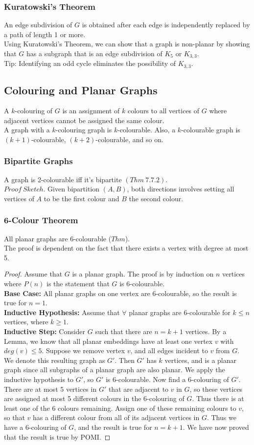 \documentclass[11pt]{article}
\newcommand{\nl}{\\[5pt]}
\begin{document}
\subsubsection{Kuratowski's Theorem}
An edge subdivision of $G$ is obtained after each edge is independently replaced by a path of length 1 or more. \nl 
Using Kuratowski's Theorem, we can show that a graph is non-planar by showing that $G$ has a subgraph that is an edge subdivision of $K_5$ or $K_{3,3}$.\nl 
Tip: Identifying an odd cycle eliminates the possibility of $K_{3,3}$.

\subsection{Colouring and Planar Graphs}
A $k$-colouring of $G$ is an assignment of $k$ colours to all vertices of $G$ where adjacent vertices cannot be assigned the same colour. \nl
A graph with a $k$-colouring graph is $k$-colourable. Also, a $k$-colourable graph is $(k+1)$-colourable, $(k+2)$-colourable, and so on.
\subsubsection{Bipartite Graphs}
A graph is 2-colourable iff it's bipartite $(Thm \: 7.7.2)$. \nl 
$Proof \: Sketch.$ Given bipartition $(A,B)$, both directions involves setting all vertices of $A$ to be the first colour and $B$ the second colour. \hfill \qedsymbol
\subsubsection{6-Colour Theorem}
All planar graphs are 6-colourable ($Thm$). \nl
The proof is dependent on the fact that there exists a vertex with degree at most 5. 
\begin{proof} Assume that $G$ is a planar graph. The proof is by induction on $n$ vertices where $P(n)$ is the statement that $G$ is 6-colourable. \nl 
\textbf{Base Case:} All planar graphs on one vertex are 6-colourable, so the result is true for $n = 1$. \nl 
\textbf{Inductive Hypothesis:} Assume that $\forall$ planar graphs are 6-colourable for $k \leq n$ vertices, where $k \geq 1$. \nl
\textbf{Inductive Step:} Consider $G$ such that there are $n = k + 1$ vertices. By a Lemma, we know that all planar embeddings have at least one vertex $v$ with $deg(v) \leq 5$. Suppose we remove vertex $v$, and all edges incident to $v$ from $G$. We denote this resulting graph as $G'$. Then $G'$ has $k$ vertices, and is a planar graph since all subgraphs of a planar graph are also planar. We apply the inductive hypothesis to $G'$, so $G'$ is 6-colourable. Now find a 6-colouring of $G'$. There are at most 5 vertices in $G'$ that are adjacent to $v$ in $G$, so these vertices are assigned at most 5 different colours in the 6-colouring of $G$. Thus there is at least one of the 6 colours remaining. Assign one of these remaining colours to $v$, so that $v$ has a different colour from all of its adjacent vertices in $G$. Thus we have a 6-colouring of $G$, and the result is true for $n = k + 1$. We have now proved that the result is true by POMI.
\end{proof}
\end{document}
